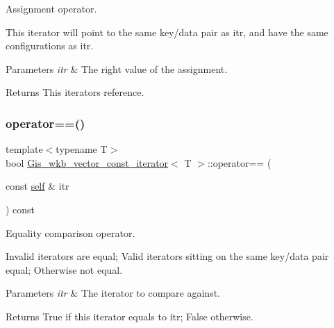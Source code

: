 Assignment operator. 

This iterator will point to the same key/data pair as itr, and have the same configurations as itr. 
\begin{DoxyParams}{Parameters}
{\em itr} & The right value of the assignment. \\
\hline
\end{DoxyParams}
\begin{DoxyReturn}{Returns}
This iterator\textquotesingle{}s reference. 
\end{DoxyReturn}
\mbox{\label{classGis__wkb__vector__const__iterator_a0bfca85b9ba671327ecec10330c1e3db}} 
\subsubsection{\texorpdfstring{operator==()}{operator==()}}
{\footnotesize\ttfamily template$<$typename T$>$ \\
bool \mbox{\hyperlink{classGis__wkb__vector__const__iterator}{Gis\+\_\+wkb\+\_\+vector\+\_\+const\+\_\+iterator}}$<$ T $>$\+::operator== (\begin{DoxyParamCaption}\item[{const \mbox{\hyperlink{classGis__wkb__vector__const__iterator}{self}} \&}]{itr }\end{DoxyParamCaption}) const\hspace{0.3cm}{\ttfamily [inline]}}



Equality comparison operator. 

Invalid iterators are equal; Valid iterators sitting on the same key/data pair equal; Otherwise not equal. 
\begin{DoxyParams}{Parameters}
{\em itr} & The iterator to compare against. \\
\hline
\end{DoxyParams}
\begin{DoxyReturn}{Returns}
True if this iterator equals to itr; False otherwise. 
\end{DoxyReturn}
\mbox{\label{classGis__wkb__vector__const__iterator_a7c480b8dd9b3e51719533ea13c3223cd}} 
